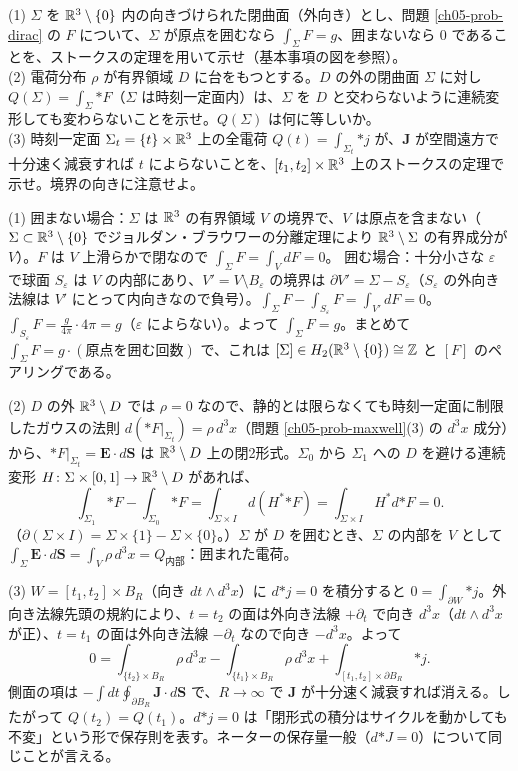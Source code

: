 \begin{problem}[難易度 B]\label{ch05-prob-flux}
(1) $\Sigma$ を $\mathbb{R}^3\setminus\{0\}$ 内の向きづけられた閉曲面（外向き）とし、問題 \ref{ch05-prob-dirac} の $F$ について、$\Sigma$ が原点を囲むなら $\int_\Sigma F=g$、囲まないなら $0$ であることを、ストークスの定理を用いて示せ（基本事項の図を参照）。\\
(2) 電荷分布 $\rho$ が有界領域 $D$ に台をもつとする。$D$ の外の閉曲面 $\Sigma$ に対し $Q(\Sigma)=\int_\Sigma{*F}$（$\Sigma$ は時刻一定面内）は、$\Sigma$ を $D$ と交わらないように連続変形しても変わらないことを示せ。$Q(\Sigma)$ は何に等しいか。\\
(3) 時刻一定面 $\Sigma_t=\{t\}\times\mathbb{R}^3$ 上の全電荷 $Q(t)=\int_{\Sigma_t}{*j}$ が、$\bm J$ が空間遠方で十分速く減衰すれば $t$ によらないことを、$[t_1,t_2]\times\mathbb{R}^3$ 上のストークスの定理で示せ。境界の向きに注意せよ。
\end{problem}

\begin{solution}
(1) 囲まない場合：$\Sigma$ は $\mathbb{R}^3$ の有界領域 $V$ の境界で、$V$ は原点を含まない（$\Sigma\subset\mathbb{R}^3\setminus\{0\}$ でジョルダン・ブラウワーの分離定理により $\mathbb{R}^3\setminus\Sigma$ の有界成分が $V$）。$F$ は $V$ 上滑らかで閉なので $\int_\Sigma F=\int_VdF=0$。
囲む場合：十分小さな $\varepsilon$ で球面 $S_\varepsilon$ は $V$ の内部にあり、$V'=V\setminus B_\varepsilon$ の境界は $\partial V'=\Sigma-S_\varepsilon$（$S_\varepsilon$ の外向き法線は $V'$ にとって内向きなので負号）。$\int_\Sigma F-\int_{S_\varepsilon}F=\int_{V'}dF=0$。$\int_{S_\varepsilon}F=\frac{g}{4\pi}\cdot4\pi=g$（$\varepsilon$ によらない）。よって $\int_\Sigma F=g$。まとめて $\int_\Sigma F=g\cdot(\text{原点を囲む回数})$ で、これは $[\Sigma]\in H_2(\mathbb{R}^3\setminus\{0\})\cong\mathbb{Z}$ と $[F]$ のペアリングである。

(2) $D$ の外 $\mathbb{R}^3\setminus D$ では $\rho=0$ なので、静的とは限らなくても時刻一定面に制限したガウスの法則 $d({*F}|_{\Sigma_t})=\rho\,d^3x$（問題 \ref{ch05-prob-maxwell}(3) の $d^3x$ 成分）から、${*F}|_{\Sigma_t}=\bm E\cdot d\bm S$ は $\mathbb{R}^3\setminus D$ 上の閉2形式。$\Sigma_0$ から $\Sigma_1$ への $D$ を避ける連続変形 $H\colon\Sigma\times[0,1]\to\mathbb{R}^3\setminus D$ があれば、
\[
\int_{\Sigma_1}{*F}-\int_{\Sigma_0}{*F}=\int_{\Sigma\times I}d(H^*{*F})=\int_{\Sigma\times I}H^*d{*F}=0 .
\]
（$\partial(\Sigma\times I)=\Sigma\times\{1\}-\Sigma\times\{0\}$。）$\Sigma$ が $D$ を囲むとき、$\Sigma$ の内部を $V$ として $\int_\Sigma\bm E\cdot d\bm S=\int_V\rho\,d^3x=Q_{\text{内部}}$：囲まれた電荷。

(3) $W=[t_1,t_2]\times B_R$（向き $dt\wedge d^3x$）に $d{*j}=0$ を積分すると $0=\int_{\partial W}{*j}$。外向き法線先頭の規約により、$t=t_2$ の面は外向き法線 $+\partial_t$ で向き $d^3x$（$dt\wedge d^3x$ が正）、$t=t_1$ の面は外向き法線 $-\partial_t$ なので向き $-d^3x$。よって
\[
0=\int_{\{t_2\}\times B_R}\rho\,d^3x-\int_{\{t_1\}\times B_R}\rho\,d^3x+\int_{[t_1,t_2]\times\partial B_R}{*j}.
\]
側面の項は $-\int dt\oint_{\partial B_R}\bm J\cdot d\bm S$ で、$R\to\infty$ で $\bm J$ が十分速く減衰すれば消える。したがって $Q(t_2)=Q(t_1)$。$d{*j}=0$ は「閉形式の積分はサイクルを動かしても不変」という形で保存則を表す。ネーターの保存量一般（$d{*J}=0$）について同じことが言える。
\end{solution}

